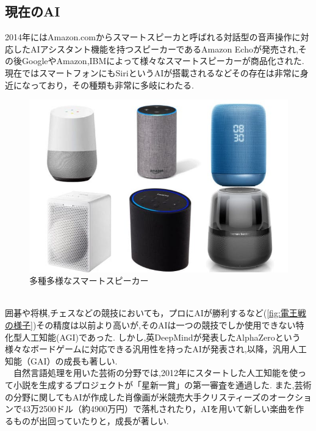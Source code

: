 \subsection{現在のAI}
2014年にはAmazon.comからスマートスピーカと呼ばれる対話型の音声操作に対応したAIアシスタント機能を持つスピーカーであるAmazon Echoが発売され,その後GoogleやAmazon,IBMによって様々なスマートスピーカーが商品化された.
現在ではスマートフォンにもSiriというAIが搭載されるなどその存在は非常に身近になっており，その種類も非常に多岐にわたる.
\begin{figure}[!ht]
    \begin{screen}
    \begin{center}
        \includegraphics[scale=0.6, clip]{./img/smartspeaker_list.jpg}
        \caption{多種多様なスマートスピーカー}
        \label{fig:多種多様なスマートスピーカー}
    \end{center}
\end{screen}
\end{figure}\\
囲碁や将棋,チェスなどの競技においても，プロにAIが勝利するなど(\ref{fig:電王戦の様子})その精度は以前より高いが,そのAIは一つの競技でしか使用できない特化型人工知能(AGI)であった.
しかし,英DeepMindが発表したAlphaZeroという様々なボードゲームに対応できる汎用性を持ったAIが発表され,以降，汎用人工知能（GAI）の成長も著しい.\\
　自然言語処理を用いた芸術の分野では,2012年にスタートした人工知能を使って小説を生成するプロジェクトが「星新一賞」の第一審査を通過した.\cite{webpage2}
また,芸術の分野に関してもAIが作成した肖像画が米競売大手クリスティーズのオークションで43万2500ドル（約4900万円）で落札されたり，AIを用いて新しい楽曲を作るものが出回っていたりと，成長が著しい.\cite{webpage3}\\
